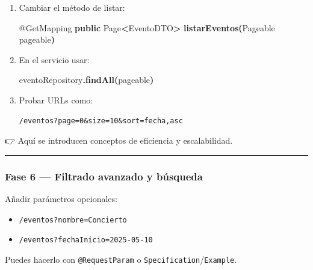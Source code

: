 \documentclass[
]{article}
\newenvironment{Shaded}{\begin{snugshade}}{\end{snugshade}}
\newcommand{\AttributeTok}[1]{\textcolor[rgb]{0.13,0.29,0.53}{#1}}
\newcommand{\BuiltInTok}[1]{#1}
\newcommand{\FunctionTok}[1]{\textcolor[rgb]{0.13,0.29,0.53}{\textbf{#1}}}
\newcommand{\KeywordTok}[1]{\textcolor[rgb]{0.13,0.29,0.53}{\textbf{#1}}}
\newcommand{\NormalTok}[1]{#1}
\newcommand{\OperatorTok}[1]{\textcolor[rgb]{0.81,0.36,0.00}{\textbf{#1}}}
\providecommand{\tightlist}{%
  \setlength{\itemsep}{0pt}\setlength{\parskip}{0pt}}
\begin{document}
\begin{enumerate}
\def\labelenumi{\arabic{enumi}.}
\item
  Cambiar el método de listar:

\begin{Shaded}
\begin{Highlighting}[]
\AttributeTok{@GetMapping}
\KeywordTok{public}\NormalTok{ Page}\OperatorTok{\textless{}}\NormalTok{EventoDTO}\OperatorTok{\textgreater{}} \FunctionTok{listarEventos}\OperatorTok{(}\BuiltInTok{Pageable}\NormalTok{ pageable}\OperatorTok{)}
\end{Highlighting}
\end{Shaded}
\item
  En el servicio usar:

\begin{Shaded}
\begin{Highlighting}[]
\NormalTok{eventoRepository}\OperatorTok{.}\FunctionTok{findAll}\OperatorTok{(}\NormalTok{pageable}\OperatorTok{)}
\end{Highlighting}
\end{Shaded}
\item
  Probar URLs como:

\begin{verbatim}
/eventos?page=0&size=10&sort=fecha,asc
\end{verbatim}
\end{enumerate}

👉 Aquí se introducen conceptos de eficiencia y escalabilidad.

\begin{center}\rule{0.5\linewidth}{0.5pt}\end{center}

\subsubsection{\texorpdfstring{\textbf{Fase 6 --- Filtrado avanzado y
búsqueda}}{Fase 6 --- Filtrado avanzado y búsqueda}}\label{fase-6-filtrado-avanzado-y-buxfasqueda}

Añadir parámetros opcionales:

\begin{itemize}
\tightlist
\item
  \texttt{/eventos?nombre=Concierto}
\item
  \texttt{/eventos?fechaInicio=2025-05-10}
\end{itemize}

Puedes hacerlo con \texttt{@RequestParam} o
\texttt{Specification}/\texttt{Example}.
\end{document}
